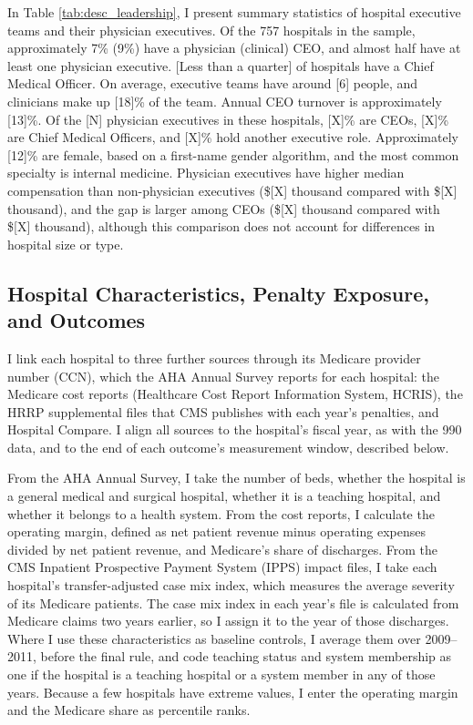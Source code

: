 \documentclass[12pt]{article}
\theoremstyle{definition}   %
\begin{document}
    
 
    In Table \ref{tab:desc_leadership}, I present summary statistics of hospital executive teams and their physician executives. Of the 757 hospitals in the sample, approximately 7\% (9\%) have a physician (clinical) CEO, and almost half have at least one physician executive. [Less than a quarter] of hospitals have a Chief Medical Officer. On average, executive teams have around [6] people, and clinicians make up [18]\% of the team. Annual CEO turnover is approximately [13]\%. Of the [N] physician executives in these hospitals, [X]\% are CEOs, [X]\% are Chief Medical Officers, and [X]\% hold another executive role. Approximately [12]\% are female, based on a first-name gender algorithm, and the most common specialty is internal medicine. Physician executives have higher median compensation than non-physician executives (\$[X] thousand compared with \$[X] thousand), and the gap is larger among CEOs (\$[X] thousand compared with \$[X] thousand), although this comparison does not account for differences in hospital size or type.

      

    \subsection{Hospital Characteristics, Penalty Exposure, and Outcomes}

    I link each hospital to three further sources through its Medicare provider number (CCN), which the AHA Annual Survey reports for each hospital: the Medicare cost reports (Healthcare Cost Report Information System, HCRIS), the HRRP supplemental files that CMS publishes with each year's penalties, and Hospital Compare. I align all sources to the hospital's fiscal year, as with the 990 data, and to the end of each outcome's measurement window, described below.

    From the AHA Annual Survey, I take the number of beds, whether the hospital is a general medical and surgical hospital, whether it is a teaching hospital, and whether it belongs to a health system. From the cost reports, I calculate the operating margin, defined as net patient revenue minus operating expenses divided by net patient revenue, and Medicare's share of discharges. From the CMS Inpatient Prospective Payment System (IPPS) impact files, I take each hospital's transfer-adjusted case mix index, which measures the average severity of its Medicare patients. The case mix index in each year's file is calculated from Medicare claims two years earlier, so I assign it to the year of those discharges. Where I use these characteristics as baseline controls, I average them over 2009--2011, before the final rule, and code teaching status and system membership as one if the hospital is a teaching hospital or a system member in any of those years. Because a few hospitals have extreme values, I enter the operating margin and the Medicare share as percentile ranks.
\end{document}
